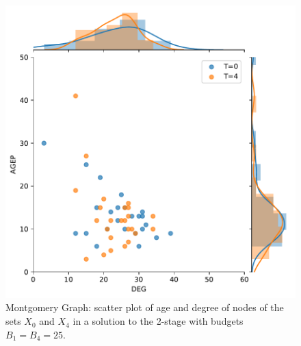 \begin{figure}[!h]
    \centering
    \includegraphics[scale = 0.5]{figures/t0_t4_compare_age_deg.pdf}
    \caption{Montgomery Graph: scatter plot of age and degree of nodes of the sets $X_0$ and $X_4$ in a solution to the 2-stage \prob{} with budgets $B_1 = B_4 = 25$.}
    \label{fig:montagedeg}
\end{figure}

\



